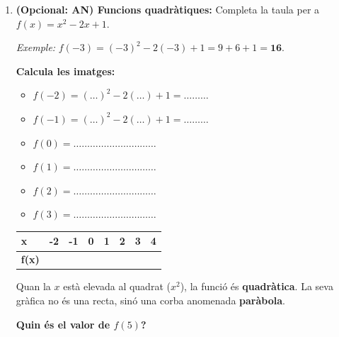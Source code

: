 \documentclass[12pt,a4paper]{article}
\begin{document}
\begin{enumerate}[leftmargin=*, label=\textbf{\arabic*.}]
    \item \textbf{(Opcional: AN) Funcions quadràtiques:} Completa la taula per a $f(x) = x^2 - 2x + 1$.
    
    \begin{minipage}{0.65\textwidth}
        \textit{Exemple:} $f(-3) = (-3)^2 - 2(-3) + 1 = 9 + 6 + 1 = \mathbf{16}$.
        \vspace{0.2cm}
        
        \textbf{Calcula les imatges:}
        \begin{itemize}
            \item $f(-2) = (\dots)^2 - 2(\dots) + 1 = \dots\dots\dots$
            \item $f(-1) = (\dots)^2 - 2(\dots) + 1 = \dots\dots\dots$
            \item $f(0) = \dots\dots\dots\dots\dots\dots\dots\dots\dots\dots$
            \item $f(1) = \dots\dots\dots\dots\dots\dots\dots\dots\dots\dots$
            \item $f(2) = \dots\dots\dots\dots\dots\dots\dots\dots\dots\dots$
            \item $f(3) = \dots\dots\dots\dots\dots\dots\dots\dots\dots\dots$
        \end{itemize}

        \begin{tabularx}{\textwidth}{|l|*{7}{X|}}
            \hline
            \textbf{x} & -2 & -1 & 0 & 1 & 2 & 3 & 4 \\ \hline
            \textbf{f(x)} & & & & & & & \\ \hline
        \end{tabularx}
    \end{minipage}
    \hfill
    \begin{minipage}{0.3\textwidth}
        \begin{tcolorbox}[colback=white,colframe=black,title=\small Nota Teòrica, fonttitle=\bfseries\small\color{black}]
            \scriptsize
            Quan la $x$ està elevada al quadrat ($x^2$), la funció és \textbf{quadràtica}. La seva gràfica no és una recta, sinó una corba anomenada \textbf{paràbola}.
        \end{tcolorbox}
    \end{minipage}

    \vspace{0.3cm}
    \textbf{Quin és el valor de $f(5)$?} \hrulefill

    \newpage
    

\end{enumerate}
\end{document}
